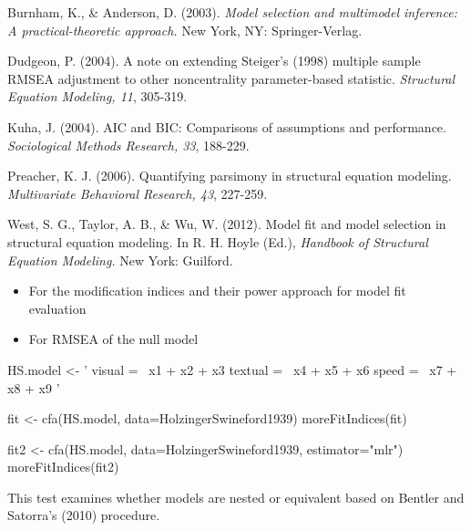 \documentclass[a4paper]{book}
\begin{document}
\begin{References}\relax
Burnham, K., \& Anderson, D. (2003). \emph{Model selection and multimodel inference: A practical-theoretic approach.} New York, NY: Springer-Verlag.

Dudgeon, P. (2004). A note on extending Steiger's (1998) multiple sample RMSEA adjustment to other noncentrality parameter-based statistic. \emph{Structural Equation Modeling, 11}, 305-319.

Kuha, J. (2004). AIC and BIC: Comparisons of assumptions and performance. \emph{Sociological Methods Research, 33}, 188-229.

Preacher, K. J. (2006). Quantifying parsimony in structural equation modeling. \emph{Multivariate Behavioral Research, 43}, 227-259.

West, S. G., Taylor, A. B., \& Wu, W. (2012). Model fit and model selection in structural equation modeling. In R. H. Hoyle (Ed.), \emph{Handbook of Structural Equation Modeling.} New York: Guilford.
\end{References}
%
\begin{SeeAlso}\relax
\begin{itemize}

\item {} For the modification indices and their power approach for model fit evaluation
\item {} For RMSEA of the null model

\end{itemize}

\end{SeeAlso}
%
\begin{Examples}
\begin{ExampleCode}
HS.model <- ' visual  =~ x1 + x2 + x3
              textual =~ x4 + x5 + x6
              speed   =~ x7 + x8 + x9 '

fit <- cfa(HS.model, data=HolzingerSwineford1939)
moreFitIndices(fit)

fit2 <- cfa(HS.model, data=HolzingerSwineford1939, estimator="mlr")
moreFitIndices(fit2)
\end{ExampleCode}
\end{Examples}
%
\begin{Description}\relax
This test examines whether models are nested or equivalent based on Bentler and Satorra's (2010) procedure.
\end{Description}
\end{document}
